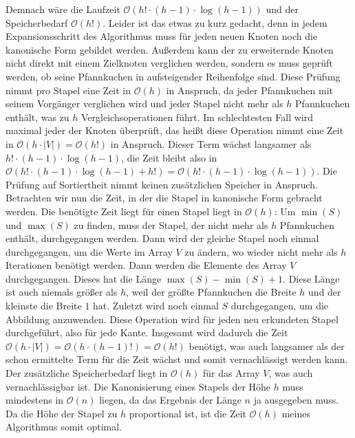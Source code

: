 \documentclass[a4paper,10pt,ngerman]{scrartcl}
\begin{document}
  Demnach wäre die Laufzeit $\mathcal{O}(h! \cdot (h-1) \cdot \log (h-1))$ und der Speicherbedarf $\mathcal{O}(h!)$. Leider ist das etwas zu kurz gedacht, denn
  in jedem Expansionsschritt des Algorithmus muss für jeden neuen Knoten noch die kanonische Form gebildet werden. Außerdem kann der zu erweiternde Knoten nicht direkt
  mit einem Zielknoten verglichen werden, sondern es muss geprüft werden, ob seine Pfannkuchen in aufsteigender Reihenfolge sind. Diese Prüfung nimmt pro Stapel eine Zeit in
$\mathcal{O}(h)$ in Anspruch, da jeder Pfannkuchen mit seinem Vorgänger verglichen wird und jeder Stapel nicht mehr als $h$ Pfannkuchen enthält, was zu $h$ Vergleichsoperationen führt.
  Im schlechtesten Fall wird maximal jeder der Knoten überprüft, das heißt diese Operation nimmt eine Zeit in $\mathcal{O}(h \cdot |V|) = \mathcal{O}(h!)$ in Anspruch. Dieser Term
  wächst langsamer als $h! \cdot (h-1) \cdot \log (h-1)$, die Zeit bleibt also in $\mathcal{O}(h! \cdot (h-1) \cdot \log (h-1) + h!) = \mathcal{O}(h! \cdot (h-1) \cdot \log (h-1))$. Die
  Prüfung auf Sortiertheit nimmt keinen zusätzlichen Speicher in Anspruch.\\
  Betrachten wir nun die Zeit, in der die Stapel in kanonische Form gebracht werden. Die benötigte Zeit liegt für einen Stapel liegt in $\mathcal{O}(h)$: Um $\min(S)$ und $\max(S)$ zu finden, muss der
  Stapel, der nicht mehr als $h$ Pfannkuchen enthält, durchgegangen werden. Dann wird der gleiche Stapel noch einmal durchgegangen, um die Werte im Array $V$ zu ändern, wo wieder nicht mehr als
$h$ Iterationen benötigt werden. Dann werden die Elemente des Array $V$ durchgegangen. Dieses hat die Länge $\max(S) - \min(S) + 1$. Diese Länge ist auch niemals größer als $h$, weil
  der größte Pfannkuchen die Breite $h$ und der kleinste die Breite $1$ hat. Zuletzt wird noch einmal $S$ durchgegangen, um die Abbildung anzuwenden. Diese Operation wird für jeden neu
  erkundeten Stapel durchgeführt, also für jede Kante. Insgesamt wird dadurch die Zeit $\mathcal{O}(h \cdot |V|) = \mathcal{O}(h \cdot (h-1)!) = \mathcal{O}(h!)$ benötigt, was auch langsamer
  als der schon ermittelte Term für die Zeit wächst und somit vernachlässigt werden kann. Der zusätzliche Speicherbedarf liegt in $\mathcal{O}(h)$ für das Array $V$, was auch vernachlässigbar ist.
  Die Kanonisierung eines Stapels der Höhe $h$ muss mindestens in $\mathcal{O}(n)$ liegen, da das Ergebnis der Länge $n$ ja ausgegeben muss. Da die Höhe der Stapel zu $h$ proportional ist,
  ist die Zeit $\mathcal{O}(h)$ meines Algorithmus somit optimal. \\
\end{document}
